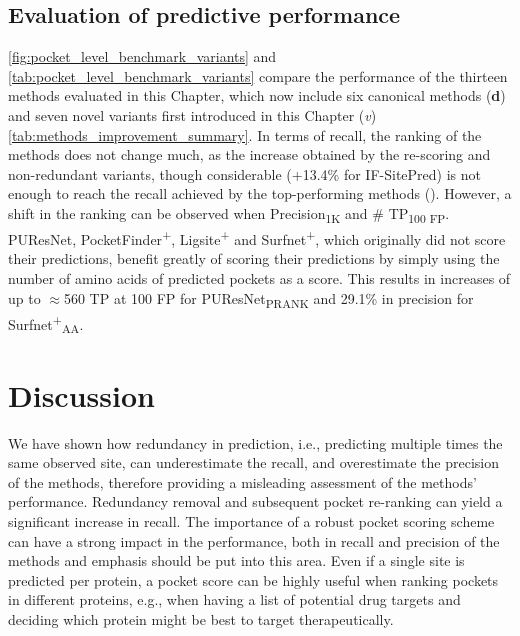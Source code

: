 \vspace{-12pt} %
\vspace{-12pt} %

\subsection{Evaluation of predictive performance}

\autoref{fig:pocket_level_benchmark_variants} and \autoref{tab:pocket_level_benchmark_variants} compare the performance of the thirteen methods evaluated in this Chapter, which now include six canonical methods (\textbf{d}) and seven novel variants first introduced in this Chapter (\textit{v}) \autoref{tab:methods_improvement_summary}. In terms of recall, the ranking of the methods does not change much, as the increase obtained by the re-scoring and non-redundant variants, though considerable (+13.4\% for IF-SitePred) is not enough to reach the recall achieved by the top-performing methods (). However, a shift in the ranking can be observed when Precision\textsubscript{1K} and \# TP\textsubscript{100 FP}. PUResNet, PocketFinder\textsuperscript{+}, Ligsite\textsuperscript{+} and Surfnet\textsuperscript{+}, which originally did not score their predictions, benefit greatly of scoring their predictions by simply using the number of amino acids of predicted pockets as a score. This results in increases of up to $\approx$560 TP at 100 FP for PUResNet\textsubscript{PRANK} and 29.1\% in precision for Surfnet\textsuperscript{+}\textsubscript{AA}.

\section{Discussion}

We have shown how redundancy in prediction, i.e., predicting multiple times the same observed site, can underestimate the recall, and overestimate the precision of the methods, therefore providing a misleading assessment of the methods' performance. Redundancy removal and subsequent pocket re-ranking can yield a significant increase in recall. The importance of a robust pocket scoring scheme can have a strong impact in the performance, both in recall and precision of the methods and emphasis should be put into this area. Even if a single site is predicted per protein, a pocket score can be highly useful when ranking pockets in different proteins, e.g., when having a list of potential drug targets and deciding which protein might be best to target therapeutically.

